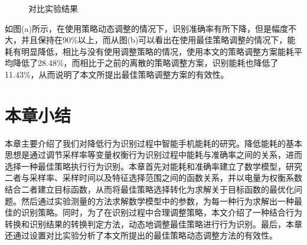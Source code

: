 \begin{figure}[!htb]
    \centering
    \caption{对比实验结果}
\end{figure}

\par 如图(a)所示，在使用策略动态调整的情况下，识别准确率有所下降，但是幅度不大，并且保持在90\%以上，而从图(b)可以看出在使用最佳策略调整的情况下，能耗有明显降低，相比与没有使用调整策略的情况，使用本文的策略调整方案能耗平均降低了28.48\%，而相比于之前的离散的策略调整方案，识别能耗也降低了11.43\%，从而说明了本文所提出最佳策略调整方案的有效性。

\section{本章小结}
\par 本章主要介绍了我们对降低行为识别过程中智能手机能耗的研究。降低能耗的基本思想是通过调节采样率等变量权衡行为识别过程中能耗与准确率之间的关系，进而选择一种最佳策略执行行为识别。本章首先对能耗和准确率建立了数学模型，研究二者与采样率、采样时间以及特征选择范围之间的函数关系，并以电量为权衡系数结合二者建立目标函数，从而将最佳策略选择转化为求解关于目标函数的最优化问题。然后通过实验测量的方法求解数学模型中的参数，为每一种行为求解出一种最佳的识别策略。同时，为了在识别过程中合理调整策略，本文介绍了一种结合行为转换和识别结果的转换判定方法，动态地调整最佳策略进行行为识别。最后，本章还通过设置对比实验分析了本文所提出的最佳策略动态调整方法的有效性。